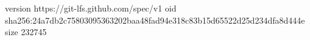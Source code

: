 version https://git-lfs.github.com/spec/v1
oid sha256:24a7db2c75803095363202baa48fad94e318c83b15d65522d25d234dfa8d444e
size 232745
